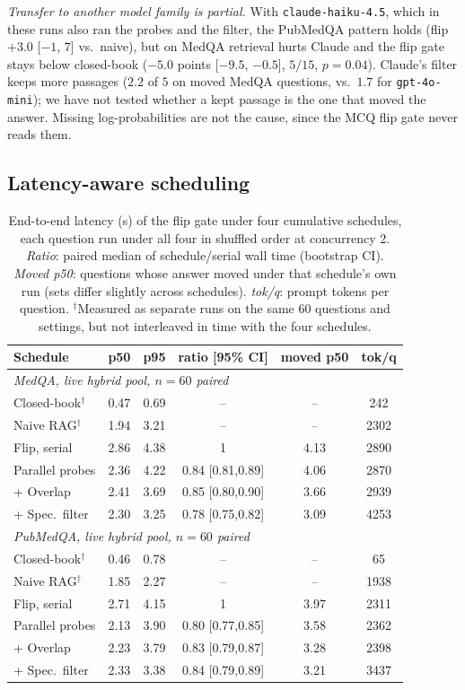 \documentclass[11pt]{article}
\begin{document}
\emph{Transfer to another model family is partial.} With
\texttt{claude-haiku-4.5}, which in these runs also ran the probes and the
filter, the PubMedQA pattern holds (flip $+3.0$ [$-1$, $7$] vs.\ naive), but on
MedQA retrieval hurts Claude and the flip gate stays below closed-book ($-5.0$
points [$-9.5$, $-0.5$], $5/15$, $p{=}0.04$). Claude's filter keeps more
passages ($2.2$ of $5$ on moved MedQA questions, vs.\ $1.7$ for
\texttt{gpt-4o-mini}); we have not tested whether a kept passage is the one that
moved the answer. Missing
log-probabilities are not the cause, since the MCQ flip gate never reads them.

\subsection{Latency-aware scheduling}
\label{sec:eval-sched}
\begin{table}[t]
\centering\scriptsize\setlength{\tabcolsep}{2.5pt}
\begin{tabular}{lccccc}
\toprule
Schedule & p50 & p95 & ratio [95\% CI] & moved p50 & tok/q \\
\midrule
\multicolumn{6}{l}{\textit{MedQA, live hybrid pool, $n{=}60$ paired}}\\
Closed-book$^\dagger$ & 0.47 & 0.69 & -- & -- & 242 \\
Naive RAG$^\dagger$   & 1.94 & 3.21 & -- & -- & 2302 \\
Flip, serial      & 2.86 & 4.38 & 1 & 4.13 & 2890 \\
Parallel probes   & 2.36 & 4.22 & 0.84 [0.81,0.89] & 4.06 & 2870 \\
+ Overlap         & 2.41 & 3.69 & 0.85 [0.80,0.90] & 3.66 & 2939 \\
+ Spec.\ filter   & 2.30 & 3.25 & 0.78 [0.75,0.82] & 3.09 & 4253 \\
\midrule
\multicolumn{6}{l}{\textit{PubMedQA, live hybrid pool, $n{=}60$ paired}}\\
Closed-book$^\dagger$ & 0.46 & 0.78 & -- & -- & 65 \\
Naive RAG$^\dagger$   & 1.85 & 2.27 & -- & -- & 1938 \\
Flip, serial      & 2.71 & 4.15 & 1 & 3.97 & 2311 \\
Parallel probes   & 2.13 & 3.90 & 0.80 [0.77,0.85] & 3.58 & 2362 \\
+ Overlap         & 2.23 & 3.79 & 0.83 [0.79,0.87] & 3.28 & 2398 \\
+ Spec.\ filter   & 2.33 & 3.38 & 0.84 [0.79,0.89] & 3.21 & 3437 \\
\bottomrule
\end{tabular}
\caption{End-to-end latency (s) of the flip gate under four cumulative
schedules, each question run under all four in shuffled order at concurrency 2.
\emph{Ratio}: paired median of schedule/serial wall time (bootstrap CI).
\emph{Moved p50}: questions whose answer moved under that schedule's own run
(sets differ slightly across schedules). \emph{tok/q}: prompt tokens per
question. $^\dagger$Measured as separate runs on the same 60 questions and settings,
but not interleaved in time with the four schedules.}
\label{tab:sched}
\end{table}
\end{document}
